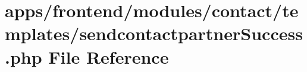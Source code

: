 \hypertarget{sendcontactpartner_success_8php}{\section{apps/frontend/modules/contact/templates/sendcontactpartner\-Success.php File Reference}
\label{sendcontactpartner_success_8php}
}
